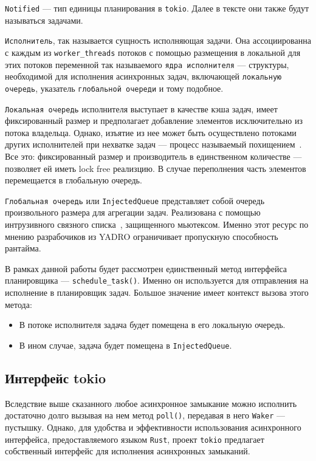 \verb|Notified| --- тип единицы планирования в \verb|tokio|. Далее в тексте они также будут называться задачами.

\verb|Исполнитель|, так называется сущность исполняющая задачи. Она ассоциированна с каждым из \verb|worker_threads| потоков с помощью размещения в локальной для этих потоков переменной так называемого \verb|ядра исполнителя| --- структуры, необходимой для исполнения асинхронных задач, включающей \verb|локальную очередь|, указатель \verb|глобальной очереди| и тому подобное.

\verb|Локальная очередь| исполнителя выступает в качестве кэша задач, имеет фиксированный размер и предполагает добавление элементов  исключительно из потока владельца. Однако, изъятие из нее может быть осуществлено потоками других исполнителей при нехватке задач --- процесс называемый похищением~\cite{cringeTokioIOUring}. Все это: фиксированный размер и производитель в единственном количестве --- позволяет ей иметь lock free реализцию. В случае переполнения часть элементов перемещается в глобальную очередь.

\verb|Глобальная очередь| или \verb|InjectedQueue| представляет собой очередь произвольного размера для агрегации задач. Реализована с помощью интрузивного связного списка~\cite{queues}, защищенного мьютексом. Именно этот ресурс по мнению разрабочиков из YADRO ограничивает пропускную способность рантайма.

В рамках данной работы будет рассмотрен единственный метод интерфейса планировщика --- \verb|schedule_task()|. Именно он используется для отправления на исполнение в планировщик задач. Большое значение имеет контекст вызова этого метода:

\begin{itemize}
    \item В потоке исполнителя задача будет помещена в его локальную очередь.
    \item В ином случае, задача будет помещена в \verb|InjectedQueue|.
\end{itemize}

\subsection{Интерфейс tokio}

Вследствие выше сказанного любое асинхронное замыкание можно исполнить достаточно долго вызывая на нем метод \verb|poll()|, передавая в него \verb|Waker| --- пустышку. Однако, для удобства и эффективности использования асинхронного интерфейса, предоставляемого языком \verb|Rust|, проект \verb|tokio| предлагает собственный интерфейс для исполнения асинхронных замыканий.

